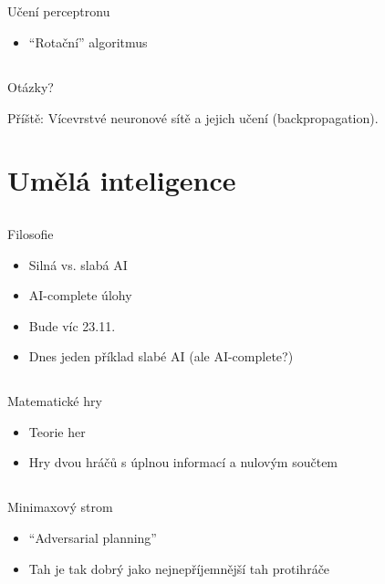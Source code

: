 \documentclass{beamer}
\begin{document}
\subsection{}
\begin{frame}{Učení perceptronu}
\begin{itemize}
\item ``Rotační'' algoritmus
\end{itemize}
\end{frame}

\subsection{}
\begin{frame}{Otázky?}
\begin{center}
Příště: Vícevrstvé neuronové sítě a jejich učení (backpropagation).
\end{center}
\end{frame}

\section{Umělá inteligence}

\subsection{}
\begin{frame}{Filosofie}
\begin{itemize}
\item Silná vs. slabá AI
\item AI-complete úlohy
\item Bude víc 23.11.
\item Dnes jeden příklad slabé AI (ale AI-complete?)
\end{itemize}
\end{frame}

\subsection{}
\begin{frame}{Matematické hry}
\begin{itemize}
\item Teorie her
\item Hry dvou hráčů s úplnou informací a nulovým součtem
\end{itemize}
\end{frame}

\subsection{}
\begin{frame}{Minimaxový strom}
\begin{itemize}
\item ``Adversarial planning''
\item Tah je tak dobrý jako nejnepříjemnější tah protihráče
\end{itemize}
\end{frame}
\end{document}
